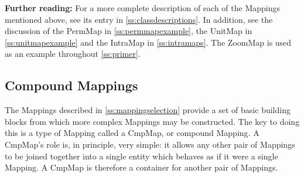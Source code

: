 \documentclass[twoside,11pt]{article}
\newcommand{\appref}[1]{Appendix~\ref{#1}}
\newcommand{\secref}[1]{\S\ref{#1}}
\renewcommand{\appref}[1]{\ref{#1}}
\renewcommand{\secref}[1]{\ref{#1}}
\begin{document}
{\bf{Further reading:}} For a more complete description of each of the
Mappings mentioned above, see its entry in
\appref{ss:classdescriptions}. In addition, see the discussion of the
PermMap in \secref{ss:permmapexample}, the UnitMap in
\secref{ss:unitmapexample} and the IntraMap in
\secref{ss:intramaps}. The ZoomMap is used as an example throughout
\secref{ss:primer}.

\subsection{\label{ss:cmpmapoverview}Compound Mappings}

The Mappings described in \secref{ss:mappingselection} provide a set
of basic building blocks from which more complex Mappings may be
constructed. The key to doing this is a type of Mapping called a
CmpMap, or compound Mapping.  A CmpMap's role is, in principle, very
simple: it allows any other pair of Mappings to be joined together
into a single entity which behaves as if it were a single Mapping. A
CmpMap is therefore a container for another pair of Mappings.
\end{document}
